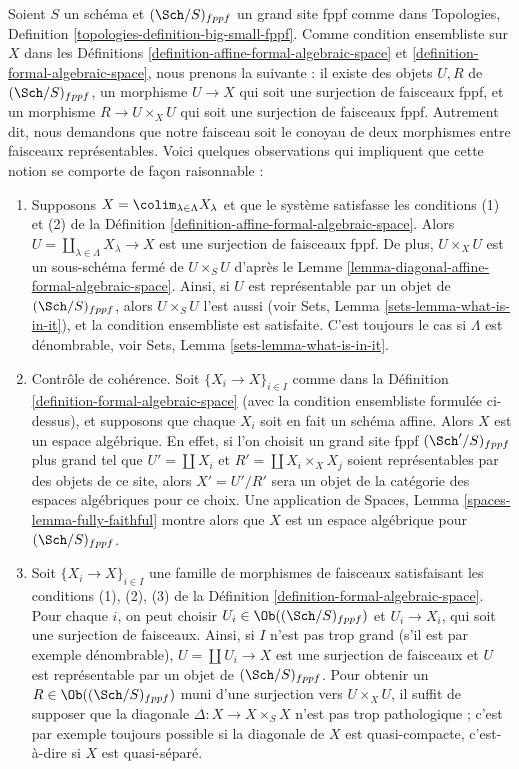 \begin{remark}
\label{remark-set-theoretic}
Soient $S$ un schéma et $(\Sch/S)_{fppf}$ un grand site fppf comme dans
Topologies, Definition \ref{topologies-definition-big-small-fppf}.
Comme condition ensembliste sur $X$ dans les
Définitions \ref{definition-affine-formal-algebraic-space} et
\ref{definition-formal-algebraic-space}, nous prenons la suivante :
il existe des objets $U, R$ de $(\Sch/S)_{fppf}$, un
morphisme $U \to X$ qui soit une surjection de faisceaux fppf, et
un morphisme $R \to U \times_X U$ qui soit une surjection de faisceaux fppf.
Autrement dit, nous demandons que notre faisceau soit le conoyau de
deux morphismes entre faisceaux représentables.
Voici quelques observations qui impliquent que cette notion se comporte
de façon raisonnable :
\begin{enumerate}
\item Supposons $X = \colim_{\lambda \in \Lambda} X_\lambda$
et que le système satisfasse les conditions (1) et (2) de la
Définition \ref{definition-affine-formal-algebraic-space}. Alors
$U = \coprod_{\lambda \in \Lambda} X_\lambda \to X$ est une surjection
de faisceaux fppf. De plus, $U \times_X U$ est un sous-schéma fermé
de $U \times_S U$ d'après le Lemme \ref{lemma-diagonal-affine-formal-algebraic-space}.
Ainsi, si $U$ est représentable par un objet de $(\Sch/S)_{fppf}$,
alors $U \times_S U$ l'est aussi (voir Sets, Lemma \ref{sets-lemma-what-is-in-it}),
et la condition ensembliste est satisfaite. C'est toujours le cas
si $\Lambda$ est dénombrable, voir Sets, Lemma \ref{sets-lemma-what-is-in-it}.
\item Contrôle de cohérence. Soit $\{X_i \to X\}_{i \in I}$ comme dans la
Définition \ref{definition-formal-algebraic-space}
(avec la condition ensembliste formulée ci-dessus),
et supposons que chaque $X_i$ soit en fait un schéma affine.
Alors $X$ est un espace algébrique. En effet, si l'on choisit un
grand site fppf $(\Sch'/S)_{fppf}$ plus grand tel que $U' = \coprod X_i$
et $R' = \coprod X_i \times_X X_j$ soient représentables par des objets
de ce site, alors $X' = U'/R'$ sera un objet de la catégorie
des espaces algébriques pour ce choix. Une application de
Spaces, Lemma \ref{spaces-lemma-fully-faithful} montre alors que
$X$ est un espace algébrique pour $(\Sch/S)_{fppf}$.
\item Soit $\{X_i \to X\}_{i \in I}$ une famille de morphismes de faisceaux
satisfaisant les conditions (1), (2), (3) de la
Définition \ref{definition-formal-algebraic-space}.
Pour chaque $i$, on peut choisir $U_i \in \Ob((\Sch/S)_{fppf})$
et $U_i \to X_i$, qui soit une surjection de faisceaux.
Ainsi, si $I$ n'est pas trop grand (s'il est par exemple dénombrable),
$U = \coprod U_i \to X$ est une surjection de faisceaux et
$U$ est représentable par un objet de $(\Sch/S)_{fppf}$.
Pour obtenir un $R \in \Ob((\Sch/S)_{fppf})$ muni d'une surjection vers $U \times_X U$,
il suffit de supposer que la diagonale $\Delta : X \to X \times_S X$ n'est pas
trop pathologique ; c'est par exemple toujours possible si la diagonale de $X$ est
quasi-compacte, c'est-à-dire si $X$ est quasi-séparé.
\end{enumerate}
\end{remark}
